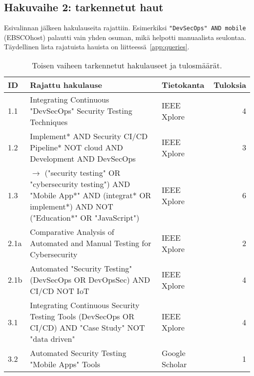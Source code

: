 \documentclass[bscthesis,finnish,oneside,biblatex]{uefcsthesis}
\begin{document}
    \subsection{Hakuvaihe 2: tarkennetut haut}
    Esivalinnan jälkeen hakulauseita rajattiin. Esimerkiksi
    \texttt{"DevSecOps" AND mobile} (EBSCOhost) palautti vain yhden osuman,
    mikä helpotti manuaalista seulontaa. Täydellinen lista rajatuista hauista on liitteessä~\ref{app:queries}.


    \begin{table}[htbp]
        \centering
        \footnotesize
        \caption{Toisen vaiheen tarkennetut hakulauseet ja tulosmäärät.}
        \label{tab:second-phase}
        \begin{tabularx}{\textwidth}{l>{\ttfamily\small\raggedright\arraybackslash}X l r}
            \toprule
            \textbf{ID} &
            \textbf{Rajattu hakulause} &
            \textbf{Tietokanta} &
            \textbf{Tuloksia} \\
            \midrule
            1.1  & Integrating Continuous "DevSecOps" Security Testing Techniques                                                            & IEEE Xplore    & 4  \\
            1.2  & Implement* AND Security CI/CD Pipeline* NOT cloud AND Development AND DevSecOps                                           & IEEE Xplore    & 3  \\
            1.3  & 2020 $\rightarrow$ ("security testing" OR "cybersecurity testing") AND "Mobile App*" AND (integrat* OR implement*) AND NOT ("Education*" OR "JavaScript") & IEEE Xplore    & 6  \\
            2.1a & Comparative Analysis of Automated and Manual Testing for Cybersecurity                                                    & IEEE Xplore    & 2  \\
            2.1b & Automated "Security Testing" (DevSecOps OR DevOpsSec) AND CI/CD NOT IoT                                                   & IEEE Xplore    & 4  \\
            3.1  & Integrating Continuous Security Testing Tools (DevSecOps OR CI/CD) AND "Case Study" NOT "data driven"                     & IEEE Xplore    & 4  \\
            3.2  & Automated Security Testing "Mobile Apps" Tools                                                                            & Google Scholar & 1  \\

\end{tabularx}
\end{table}
\end{document}
